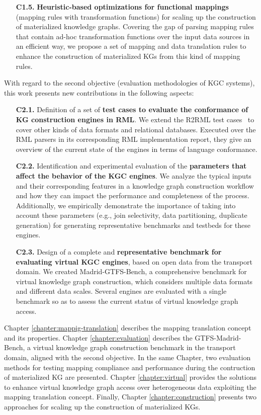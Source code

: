 \begin{enumerate}
    \item[\textbf{C1.5.}] \textbf{Heuristic-based optimizations for functional mappings} (mapping rules with transformation functions) for scaling up the construction of materialized knowledge graphs. Covering the gap of parsing mapping rules that contain ad-hoc transformation functions over the input data sources in an efficient way, we propose a set of mapping and data translation rules to enhance the construction of materialized KGs from this kind of mapping rules.
\end{enumerate}

With regard to the second objective (evaluation methodologies of KGC systems), this work presents new contributions in the following aspects:
\begin{enumerate}
    \item[\textbf{C2.1.}] Definition of a set of \textbf{test cases to evaluate the conformance of KG construction engines in RML}. We extend the R2RML test cases~\citep{R2RML_test_cases} to cover other kinds of data formats and relational databases. Executed over the RML parsers in its corresponding RML implementation report, they give an overview of the current state of the engines in terms of language conformance.
    \item[\textbf{C2.2.}] Identification and experimental evaluation of the \textbf{parameters that affect the behavior of the KGC engines}. We analyze the typical inputs and their corresponding features in a knowledge graph construction workflow and how they can impact the performance and completeness of the process. Additionally, we empirically demonstrate the importance of taking into account these parameters (e.g., join selectivity, data partitioning, duplicate generation) for generating representative benchmarks and testbeds for these engines.
    \item[\textbf{C2.3.}] Design of a complete and \textbf{representative benchmark for evaluating virtual KGC engines}, based on open data from the transport domain. We created Madrid-GTFS-Bench, a comprehensive benchmark for virtual knowledge graph construction, which considers multiple data formats and different data scales. Several engines are evaluated with a single benchmark so as to assess the current status of virtual knowledge graph access.
\end{enumerate}

Chapter \ref{chapter:mappig-translation} describes the mapping translation concept and its properties. Chapter \ref{chapter:evaluation} describes the GTFS-Madrid-Bench, a virtual knowledge graph construction benchmark in the transport domain, aligned with the second objective. In the same Chapter, two evaluation methods for testing mapping compliance and performance during the contruction of materialized KG are presented. Chapter \ref{chapter:virtual} provides the solutions to enhance virtual knowledge graph access over heterogeneous data exploiting the mapping translation concept. Finally, Chapter \ref{chapter:construction} presents two approaches for scaling up the construction of materialized KGs. 

